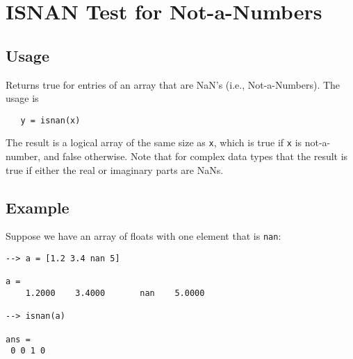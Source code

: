\section{ISNAN Test for Not-a-Numbers}

\subsection{Usage}

Returns true for entries of an array that are NaN's (i.e.,
Not-a-Numbers).  The usage is
\begin{verbatim}
   y = isnan(x)
\end{verbatim}
The result is a logical array of the same size as \verb|x|,
which is true if \verb|x| is not-a-number, and false otherwise.
Note that for complex data types that
the result is true if either the real or imaginary parts
are NaNs.
\subsection{Example}

Suppose we have an array of floats with one element that
is \verb|nan|:
\begin{verbatim}
--> a = [1.2 3.4 nan 5]

a = 
    1.2000    3.4000       nan    5.0000 

--> isnan(a)

ans = 
 0 0 1 0 
\end{verbatim}
